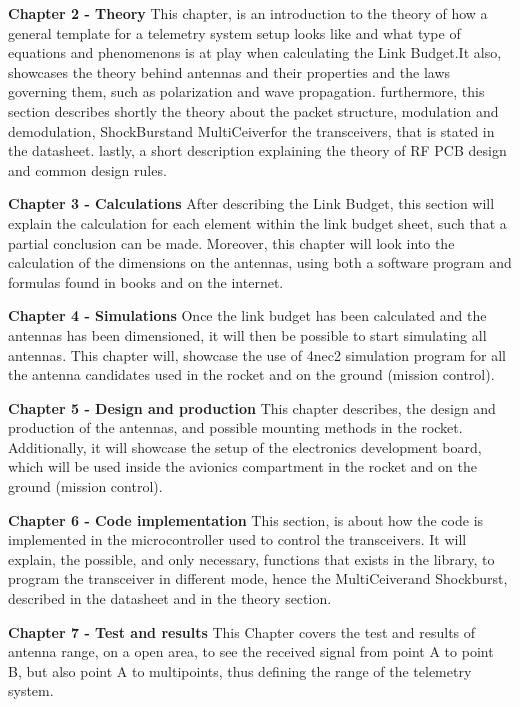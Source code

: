 
\textbf{Chapter 2 - Theory}
This chapter, is an introduction to the theory of how a general template for a telemetry system setup looks like and what type of equations and phenomenons is at play when calculating the Link Budget.It also, showcases the theory behind antennas and their properties and the laws governing them, such as polarization and wave propagation. furthermore, this section describes shortly the theory about the packet structure, modulation and demodulation, ShockBurst\texttrademark and MultiCeiver\texttrademark for the transceivers, that is stated in the datasheet\cite{nrf24l01+}. lastly, a short description explaining the theory of RF PCB design and common design rules. 

\textbf{Chapter 3 - Calculations}
After describing the Link Budget, this section will explain the calculation for each element within the link budget sheet, such that a partial conclusion can be made. Moreover, this chapter will look into the calculation of the dimensions on the antennas, using both a software program and formulas found in books and on the internet. 

\textbf{Chapter 4 - Simulations}
Once the link budget has been calculated and the antennas has been dimensioned, it will then be possible to start simulating all antennas. This chapter will, showcase the use of 4nec2 simulation program for all the antenna candidates used in the rocket and on the ground (mission control).    

\textbf{Chapter 5 - Design and production}
This chapter describes, the design and production of the antennas, and possible mounting methods in the rocket. Additionally, it will showcase the setup of the electronics development board, which will be used inside the avionics compartment in the rocket and on the ground (mission control). 

\textbf{Chapter 6 - Code implementation}
This section, is about how the code is implemented in the microcontroller used to control the transceivers. It will explain, the possible, and only necessary, functions that exists in the library, to program the transceiver in different mode, hence the MultiCeiver\texttrademark and Shockburst\texttrademark\cite{nrf24l01+}, described in the datasheet and in the theory section.  

\textbf{Chapter 7 - Test and results}
This Chapter covers the test and results of antenna range, on a open area, to see the received signal from point A to point B, but also point A to multipoints, thus defining the range of the telemetry system.

